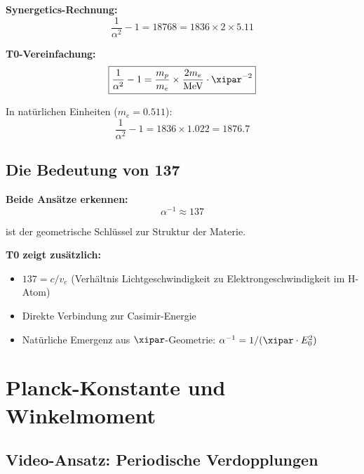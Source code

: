 	\begin{vergleich}
		\textbf{Synergetics-Rechnung:}
		\begin{equation}
			\frac{1}{\alpha^2} - 1 = 18768 = 1836 \times 2 \times 5.11
		\end{equation}
		
		\textbf{T0-Vereinfachung:}
		\begin{equation}
			\boxed{\frac{1}{\alpha^2} - 1 = \frac{m_p}{m_e} \times \frac{2m_e}{\text{MeV}} \cdot \xipar^{-2}}
		\end{equation}
		
		In natürlichen Einheiten ($m_e = 0.511$):
		\begin{equation}
			\boxed{\frac{1}{\alpha^2} - 1 = 1836 \times 1.022 = 1876.7}
		\end{equation}
	\end{vergleich}
	
	\subsection{Die Bedeutung von 137}
	
	\begin{gemeinsam}
		\textbf{Beide Ansätze erkennen:}
		\begin{equation}
			\alpha^{-1} \approx 137
		\end{equation}
		
		ist der geometrische Schlüssel zur Struktur der Materie.
		
		\textbf{T0 zeigt zusätzlich:}
		\begin{itemize}
			\item $137 = c/v_e$ (Verhältnis Lichtgeschwindigkeit zu Elektrongeschwindigkeit im H-Atom)
			\item Direkte Verbindung zur Casimir-Energie
			\item Natürliche Emergenz aus $\xipar$-Geometrie: $\alpha^{-1} = 1/(\xipar \cdot E_0^2)$
		\end{itemize}
	\end{gemeinsam}
	
	\section{Planck-Konstante und Winkelmoment}
	
	\subsection{Video-Ansatz: Periodische Verdopplungen}
	
